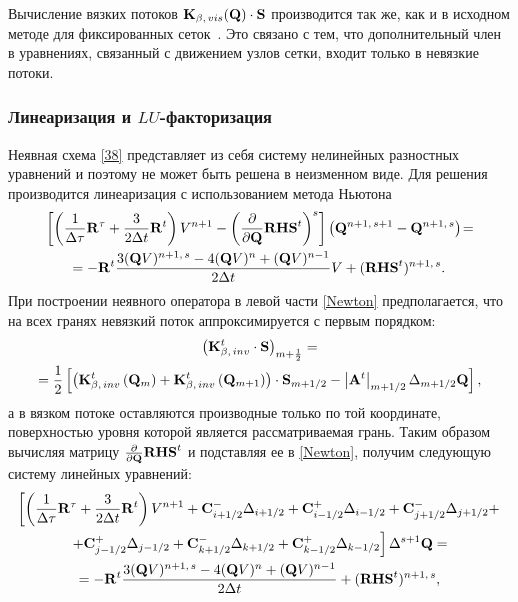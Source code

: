 Вычисление вязких потоков ${\bf{K}}_{\beta,\, vis}({\bf{Q}}) \cdot {\bf{S}}$ производится так же, как и 
в исходном методе для фиксированных сеток~\cite{Cher}. Это связано с тем, что дополнительный член в 
уравнениях, связанный с движением узлов сетки, входит только в невязкие потоки. 

\subsubsection{Линеаризация и $LU$-факторизация}
\label{s:1253}
Неявная схема \eqref{38} представляет из себя систему нелинейных разностных уравнений и поэтому не может быть 
решена в неизменном виде. Для решения производится линеаризация с использованием метода Ньютона
\begin{gather}
  \left[ {\left( {\frac{1}{{\Delta \tau }}{\bf{R}}^\tau   + \frac{3}{{2\Delta t}}{\bf{R}}^t } \right)V^{n+1}- 
  \left( {\frac{\partial }{{\partial {\bf{Q}}}}{\bf{RHS}}^t} \right)^s } \right]
  \left( {\bf{Q}}^{n + 1,\,s + 1}  - {\bf{Q}}^{n + 1,\,s} \right) \! = \notag \\ \!=
  - {\bf{R}}^t \frac{{3({\bf{Q}}V)^{n + 1,\,s} - 4({\bf{Q}}V)^n + ({\bf{Q}}V)^{n - 1} }}
  {{2\Delta t}}V + ({\bf{RHS}}^t)^{n + 1,\,s}. 
  \label{Newton}
\end{gather}
При построении неявного оператора в левой части \eqref{Newton} предполагается, что на всех гранях 
невязкий поток аппроксимируется с первым порядком:
\begin{gather}
  \left( {{\bf{K}}_{\beta,\, inv}^t  \cdot {\bf{S}}} \right)_{m + \frac{1}{2}} = \notag \\ =
  \frac{1}{2}\left[ \left( {{\bf{K}}_{\beta,\, inv}^t \left( {{\bf{Q}}_m } \right) +
  {\bf{K}}_{\beta,\, inv}^t \left( {{\bf{Q}}_{m+1}} \right)} \right) \cdot {\bf{S}}_{m + 1/2} - 
  \left| {{\bf{A}}^t } \right|_{m+1/2} \Delta_{m+1/2} {\bf{Q}} \right],  
  \label{Kinv1} 
\end{gather}
а в вязком потоке оставляются производные только по той координате, поверхностью уровня которой является 
рассматриваемая грань. Таким образом вычисляя матрицу $\frac{\partial}{\partial {\bf{Q}}}{\bf{RHS}}^t$ и 
подставляя ее в \eqref{Newton}, получим следующую систему линейных уравнений:
\begin{gather}
  \left[ \left( {\frac{1}{{\Delta \tau }}{\bf{R}}^\tau + \frac{3}{{2\Delta t}}{\bf{R}}^t }\right)V^{n+1} + 
  {\bf{C}}_{i + 1/2}^- \Delta_{i + 1/2} + {\bf{C}}_{i - 1/2}^+ \Delta_{i - 1/2} +
  {\bf{C}}_{j + 1/2}^- \Delta_{j + 1/2} + \right. \notag \\ \left.
  + {\bf{C}}_{j - 1/2}^+ \Delta_{j - 1/2} +   {\bf{C}}_{k + 1/2}^- \Delta_{k + 1/2} + 
  {\bf{C}}_{k - 1/2}^+ \Delta_{k - 1/2} \right] \Delta^{s+1}{\bf{Q}} = \notag \\ =
  - {\bf{R}}^t \frac{3({\bf{Q}}V)^{n + 1,\,s} - 4({\bf{Q}}V)^n + 
  ({\bf{Q}}V)^{n - 1}}{2\Delta t} + ({\bf{RHS}}^t)^{n + 1,\,s}, 
  \label{discret} 
\end{gather}
